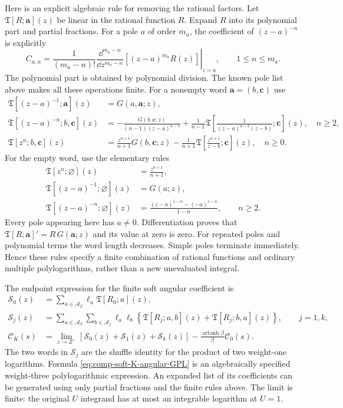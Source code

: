 Here is an explicit algebraic rule for removing the rational factors.
Let $\mathfrak T[R;\boldsymbol a](z)$ be linear in the rational function
$R$. Expand $R$ into its polynomial part and partial fractions. For a pole
$a$ of order $m_a$, the coefficient of $(z-a)^{-n}$ is explicitly
\begin{equation}
 C_{a,n}=\left.\frac1{(m_a-n)!}
 \frac{\dd^{m_a-n}}{\dd z^{m_a-n}}
 [(z-a)^{m_a}R(z)]\right|_{z=a},\qquad 1\leq n\leq m_a.
\end{equation}
The polynomial part is obtained by polynomial division. The known pole
list above makes all these operations finite. For a
nonempty word $\boldsymbol a=(b,\boldsymbol c)$ use
\begin{align}
 \mathfrak T[(z-a)^{-1};\boldsymbol a](z)
 &=G(a,\boldsymbol a;z),\\
 \mathfrak T[(z-a)^{-n};b,\boldsymbol c](z)
 &=-\frac{G(b,\boldsymbol c;z)}{(n-1)(z-a)^{n-1}}
 +\frac1{n-1}\mathfrak T\!\left[
 \frac1{(z-a)^{n-1}(z-b)};\boldsymbol c\right](z),
 \quad n\geq2,\\
 \mathfrak T[z^n;b,\boldsymbol c](z)
 &=\frac{z^{n+1}}{n+1}G(b,\boldsymbol c;z)
 -\frac1{n+1}\mathfrak T\!\left[
 \frac{z^{n+1}}{z-b};\boldsymbol c\right](z),
 \quad n\geq0.
\end{align}
For the empty word, use the elementary rules
\begin{align}
 \mathfrak T[z^n;\varnothing](z)&=\frac{z^{n+1}}{n+1},\\
 \mathfrak T[(z-a)^{-1};\varnothing](z)&=G(a;z),\\
 \mathfrak T[(z-a)^{-n};\varnothing](z)
 &=\frac{(z-a)^{1-n}-(-a)^{1-n}}{1-n},\qquad n\geq2.
\end{align}
Every pole appearing here has $a\ne0$. Differentiation proves that
$\mathfrak T[R;\boldsymbol a]'=R\,G(\boldsymbol a;z)$ and its value
at zero is zero. For repeated poles and polynomial terms the word
length decreases. Simple poles terminate immediately. Hence these
rules specify a finite combination of rational functions and ordinary
multiple polylogarithms, rather than a new unevaluated integral.

The endpoint expression for the finite soft angular coefficient is
\begin{align}
 \mathcal S_0(z)&=\sum_{a\in\mathcal A_\beta}
 \ell_a\mathfrak T[R_0;a](z),\\
 \mathcal S_j(z)&=\sum_{a\in\mathcal A_\beta}
 \sum_{b\in\mathcal A_j}\ell_a\ell_b
 \left\{\mathfrak T[R_j;a,b](z)
 +\mathfrak T[R_j;b,a](z)\right\},\qquad j=1,k,\\
 \mathcal C_K(s)&=\lim_{z\to Z^-}
 [\mathcal S_0(z)+\mathcal S_1(z)+\mathcal S_k(z)]
 -\frac{\operatorname{artanh}\beta}{\beta}\mathcal C_0(s).
 \label{eq:comp-soft-K-angular-GPL}
\end{align}
The two words in $\mathcal S_j$ are the shuffle identity for the product
of two weight-one logarithms. Formula \eqref{eq:comp-soft-K-angular-GPL}
is an algebraically specified weight-three polylogarithmic expression.
An expanded list of its coefficients can be generated using only
partial fractions and the finite rules above. The limit is finite:
the original $U$ integrand has at most an integrable logarithm at $U=1$.

